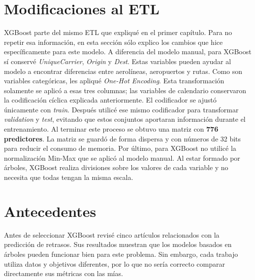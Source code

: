 \documentclass[a4paper,12pt,twocolumn]{report}
\begin{document}
\section{Modificaciones al ETL}

XGBoost parte del mismo ETL que expliqué en el primer capítulo. Para no repetir esa información, en esta sección sólo explico los cambios que hice específicamente para este modelo.
\newline
A diferencia del modelo manual, para XGBoost sí conservé \textit{UniqueCarrier}, \textit{Origin} y \textit{Dest}. Estas variables pueden ayudar al modelo a encontrar diferencias entre aerolíneas, aeropuertos y rutas. Como son variables categóricas, les apliqué \textit{One-Hot Encoding}. Esta transformación solamente se aplicó a esas tres columnas; las variables de calendario conservaron la codificación cíclica explicada anteriormente.
\newline
El codificador se ajustó únicamente con \textit{train}. Después utilicé ese mismo codificador para transformar \textit{validation} y \textit{test}, evitando que estos conjuntos aportaran información durante el entrenamiento. Al terminar este proceso se obtuvo una matriz con \textbf{776 predictores}. La matriz se guardó de forma dispersa y con números de 32 bits para reducir el consumo de memoria.
\newline
Por último, para XGBoost no utilicé la normalización Min-Max que se aplicó al modelo manual. Al estar formado por árboles, XGBoost realiza divisiones sobre los valores de cada variable y no necesita que todas tengan la misma escala.

\section{Antecedentes}

Antes de seleccionar XGBoost revisé cinco artículos relacionados con la predicción de retrasos. Sus resultados muestran que los modelos basados en árboles pueden funcionar bien para este problema. Sin embargo, cada trabajo utiliza datos y objetivos diferentes, por lo que no sería correcto comparar directamente sus métricas con las mías.
\end{document}
